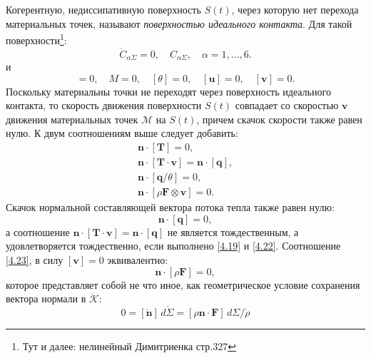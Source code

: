 Когерентную, недиссипативную поверхность $S(t)$, через которую нет перехода материальных точек, называют \textit{поверхностью идеального контакта}. Для такой поверхности\footnote{Тут и далее: нелинейный Димитриенка стр.327}: 
\begin{equation}
	\mathring{C}_{\alpha\Sigma} = 0, \quad C_{\alpha\Sigma}, \quad \alpha = 1, \dots, 6.
\end{equation}
и 
\begin{equation}
	[\mathring{\mathbf{x}}] = 0, \quad M = 0, \quad [\theta] = 0, \quad [\mathbf{u}] = 0, \quad [\mathbf{v}] = 0. \label{4.19}
\end{equation}
Поскольку материальны точки не переходят через поверхность идеального контакта, то скорость движения поверхности $S(t)$ совпадает со скоростью $\mathbf{v}$ движения материальных точек $\mathcal{M}$ на $S(t)$, причем скачок скорости также равен нулю.
К двум соотношениям выше следует добавить: 
\begin{gather}
	\mathbf{n} \cdot [\mathbf{T}] = 0, \label{4.20} \\
	\mathbf{n} \cdot [\mathbf{T} \cdot \mathbf{v}] = \mathbf{n} \cdot [\mathbf{q}], \label{4.21} \\
	\mathbf{n} \cdot [\mathbf{q}/\theta] = 0, \label{4.22}\\
	\mathbf{n} \cdot [\rho \mathbf{F} \otimes \mathbf{v}] = 0. \label{4.23}
\end{gather}
Скачок нормальной составляющей вектора потока тепла также равен нулю:
\begin{equation}
	\mathbf{n} \cdot [\mathbf{q}] = 0,
\end{equation}
а соотношение $	\mathbf{n} \cdot [\mathbf{T} \cdot \mathbf{v}] = \mathbf{n} \cdot [\mathbf{q}]$ не является тождественным, а удовлетворяется тождественно, если выполнено \ref{4.19} и \ref{4.22}. Соотношение \ref{4.23}, в силу $[\mathbf{v}] = 0$ эквивалентно:
\begin{equation}
	\mathbf{n} \cdot [\rho \mathbf{F}] = 0,
\end{equation}
которое представляет собой не что иное, как геометрическое условие сохранения вектора нормали в $\mathring{\mathcal{K}}$:
\begin{equation*}
	0 = [\mathring{\mathbf{n}}] \, d\mathring{\Sigma} = [\rho \mathbf{n} \cdot \mathbf{F}] \, d\Sigma/\mathring{\rho}
\end{equation*}

